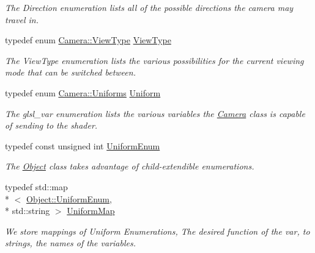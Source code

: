 \begin{DoxyCompactItemize}
\begin{DoxyCompactList}\small\item\em The Direction enumeration lists all of the possible directions the camera may travel in. \end{DoxyCompactList}\item 
typedef enum \hyperlink{class_camera_aaa256acd50a2fa143d9f8d9456e2802f}{Camera\-::\-View\-Type} \hyperlink{class_camera_a5b2dc5eaed6cbaabee0eea3f2714acd7}{View\-Type}
\begin{DoxyCompactList}\small\item\em The View\-Type enumeration lists the various possibilities for the current viewing mode that can be switched between. \end{DoxyCompactList}\item 
typedef enum \hyperlink{class_camera_a630738fd23098d44c0d15ee28d5649dd}{Camera\-::\-Uniforms} \hyperlink{class_camera_a0ed19c96505cbb70625938d1e883af24}{Uniform}
\begin{DoxyCompactList}\small\item\em The glsl\-\_\-var enumeration lists the various variables the \hyperlink{class_camera}{Camera} class is capable of sending to the shader. \end{DoxyCompactList}\item 
typedef const unsigned int \hyperlink{class_object_a79b74057dbc5182b85c9c3ba8480fcf2}{Uniform\-Enum}
\begin{DoxyCompactList}\small\item\em The \hyperlink{class_object}{Object} class takes advantage of child-\/extendible enumerations. \end{DoxyCompactList}\item 
typedef std\-::map\\*
$<$ \hyperlink{class_object_a79b74057dbc5182b85c9c3ba8480fcf2}{Object\-::\-Uniform\-Enum}, \\*
std\-::string $>$ \hyperlink{class_object_a6e19bd8516360bff956408cbae33b878}{Uniform\-Map}
\begin{DoxyCompactList}\small\item\em We store mappings of Uniform Enumerations, The desired function of the var, to strings, the names of the variables. \end{DoxyCompactList}\end{DoxyCompactItemize}

